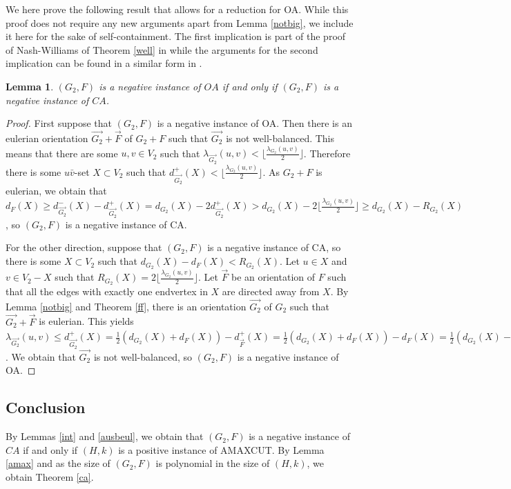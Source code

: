 \documentclass[a4paper,12pt,makeidx]{article}
\newtheorem{lemma}{Lemma}
\begin{document}
We here prove the following result that allows for a reduction for OA. While this proof does not require any new arguments apart from Lemma \ref{notbig}, we include it here for the sake of self-containment.
The first implication is part of the proof of Nash-Williams of Theorem \ref{well} in \cite{NW} while the arguments for the second implication can be found in a similar form in \cite{ks}.

\begin{lemma}\label{equiv}
$(G_2,F)$ is a negative instance of $OA$ if and only if $(G_2,F)$ is a negative instance of $CA$.
\end{lemma}
\begin{proof}

 First suppose that $(G_2,F)$ is a negative instance of OA. Then there is an eulerian orientation $\vec{G_2}+\vec{F}$ of $G_2+F$ such that $\vec{G_2}$ is not well-balanced. This means that there are some  $u,v \in V_2$ such that $\lambda_{\vec{G_2}}(u,v)<\lfloor\frac{\lambda_{G_2}(u,v)}{2}\rfloor$. Therefore there is some $u\bar{v}$-set $X \subset V_2$ such that $d_{\vec{G_2}}^+(X)<\lfloor\frac{\lambda_{G_2}(u,v)}{2}\rfloor$. As $G_2+F$ is eulerian, we obtain that $d_F(X)\geq d_{\vec{G_2}}^-(X)-d_{\vec{G_2}}^+(X)=d_{G_2}(X)-2d_{\vec{G_2}}^+(X)>d_{G_2}(X)-2\lfloor\frac{\lambda_{G_2}(u,v)}{2}\rfloor\geq d_{G_2}(X)-R_{G_2}(X)$, so $(G_2,F)$ is a negative instance of CA.

For the other direction, suppose that $(G_2,F)$ is a negative instance of CA, so there is some $X\subset V_2$ such that  $d_{G_2}(X)-d_F(X)<R_{G_2}(X)$. Let $u \in X$ and $v \in V_2-X$ such that $R_{G_2}(X)=2\lfloor\frac{\lambda_{G_2}(u,v)}{2}\rfloor$. Let $\vec{F}$ be an orientation of $F$ such that all the edges with exactly one endvertex in $X$ are directed away from $X$. By Lemma \ref{notbig} and Theorem \ref{ff}, there is an orientation $\vec{G_2}$ of $G_2$ such that $\vec{G_2}+\vec{F}$ is eulerian. This yields $\lambda_{\vec{G_2}}(u,v)\leq d^+_{\vec{G_2}}(X)=\frac{1}{2}(d_{G_2}(X)+d_F(X))-d^+_{\vec{F}}(X)=\frac{1}{2}(d_{G_2}(X)+d_F(X))-d_{F}(X)=\frac{1}{2}(d_{G_2}(X)-d_F(X))<\frac{1}{2}R_{G_2}(X)=\lfloor\frac{\lambda_{G_2}(u,v)}{2}\rfloor$. We obtain that $\vec{G_2}$ is not well-balanced, so $(G_2,F)$ is a negative instance of OA.
\end{proof}
\subsection{Conclusion}

By Lemmas \ref{int} and \ref{ausbeul}, we obtain that $(G_2,F)$ is a negative instance of $CA$ if and only if $(H,k)$ is a positive instance of AMAXCUT. By Lemma \ref{amax} and as the size of $(G_2,F)$ is polynomial in the size of $(H,k)$, we obtain Theorem \ref{ca}.
\end{document}
